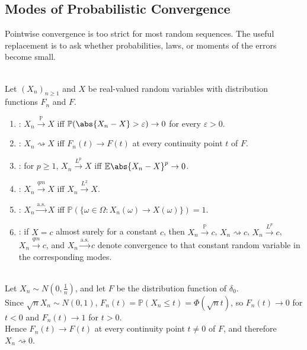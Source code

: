 \subsection{Modes of Probabilistic Convergence}

Pointwise convergence is too strict for most random sequences. The useful replacement is to ask whether probabilities, laws, or moments of the errors become small.

\begin{definition} \label{def:probability-and-distribution-convergence} \label{def:lp-quadratic-and-almost-sure-convergence} \\
Let $(X_n)_{n\geq1}$ and $X$ be real-valued random variables with distribution functions $F_n$ and $F$.
\begin{enumerate}[label=(\roman*)]
\setlength{\itemsep}{0pt}
\item {}: $X_n\xrightarrow{\mathbb{P}}X$ iff $\mathbb{P}(\abs{X_n-X}>\varepsilon)\to0$ for every $\varepsilon>0$.
\item {}: $X_n\rightsquigarrow X$ iff $F_n(t)\to F(t)$ at every continuity point $t$ of $F$.
\item {}: for $p\geq1$, $X_n\xrightarrow{L^p}X$ iff $\mathbb{E}\abs{X_n-X}^p\to0$.
\item {}: $X_n\xrightarrow{qm}X$ iff $X_n\xrightarrow{L^2}X$.
\item {}: $X_n\xrightarrow{\mathrm{a.s.}}X$ iff $\mathbb{P}(\{\omega\in\Omega:X_n(\omega)\to X(\omega)\})=1$.
\item {}: if $X=c$ almost surely for a constant $c$, then $X_n\xrightarrow{\mathbb{P}}c$, $X_n\rightsquigarrow c$, $X_n\xrightarrow{L^p}c$, $X_n\xrightarrow{qm}c$, and $X_n\xrightarrow{\mathrm{a.s.}}c$ denote convergence to that constant random variable in the corresponding modes.
\end{enumerate}
\end{definition}

\begin{example} \label{ex:shrinking-normal-converges-to-point-mass} \\
Let $X_n\sim N(0,\frac{1}{n})$, and let $F$ be the distribution function of $\delta_0$.\\
Since $\sqrt{n}X_n\sim N(0,1)$, $F_n(t)=\mathbb{P}(X_n\leq t)=\Phi(\sqrt{n}t)$, so $F_n(t)\to0$ for $t<0$ and $F_n(t)\to1$ for $t>0$.\\
Hence $F_n(t)\to F(t)$ at every continuity point $t\neq0$ of $F$, and therefore $X_n\rightsquigarrow0$.
\end{example}

